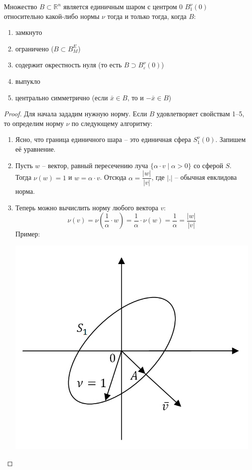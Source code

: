 \begin{theorem}[Минковского]
    Множество $B \subset \mathbb{R}^n$ является единичным шаром с центром 0 $B_1^{\nu}(0)$ относительно какой-либо нормы $\nu$ тогда и только тогда, когда $B$:\begin{enumerate}
        \item замкнуто
        \item ограничено ($B \subset B_M^E$)
        \item содержит окрестность нуля (то есть $B \supset B_\varepsilon^\nu(0)$)
        \item выпукло
        \item центрально симметрично (если $\bar x \in B$, то и $-\bar x \in B$)
    \end{enumerate}
\end{theorem}
\begin{proof}
        Для начала зададим нужную норму. Если $B$ удовлетворяет свойствам 1--5, то определим норму $\nu$ по следующему алгоритму:
    \begin{enumerate}
        \item Ясно, что граница единичного шара -- это единичная сфера $S_1^\nu(0)$. Запишем её уравнение.
        \item Пусть $w$ -- вектор, равный пересечению луча $\{\alpha\cdot v\mid \alpha > 0\}$ со сферой $S$. Тогда $\nu(w) = 1$ и $w = \alpha \cdot v$. Отсюда $\alpha = \dfrac{|w|}{|v|}$, где $|.|$ -- обычная евклидова норма.
        \item Теперь можно вычислить норму любого вектора $v$:
            \[\nu(v) = \nu\left(\dfrac{1}{\alpha}\cdot w\right) = \dfrac{1}{\alpha} \cdot \nu(w) = \dfrac{1}{\alpha} = \dfrac{|w|}{|v|}\]
        Пример:
        \begin{center}\includegraphics[scale=0.6]{l5_2.png}\\

\end{center}
\end{enumerate}
\end{proof}
